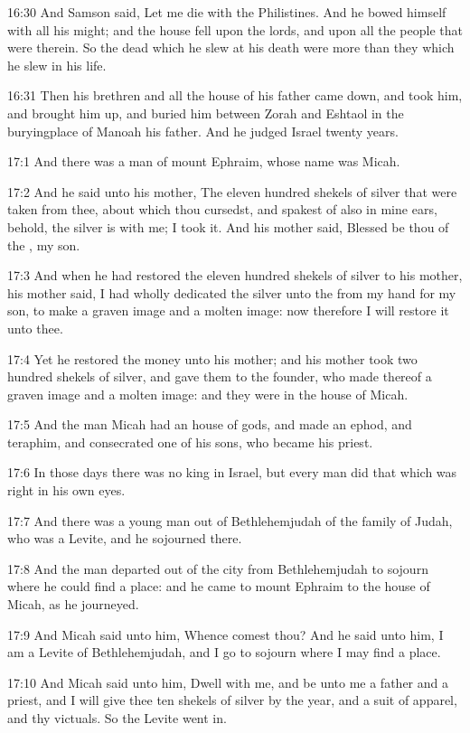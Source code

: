16:30 And Samson said, Let me die with the Philistines. And he bowed himself with all his might; and the house fell upon the lords, and upon all the people that were therein. So the dead which he slew at his death were more than they which he slew in his life.

16:31 Then his brethren and all the house of his father came down, and took him, and brought him up, and buried him between Zorah and Eshtaol in the buryingplace of Manoah his father. And he judged Israel twenty years.

17:1 And there was a man of mount Ephraim, whose name was Micah.

17:2 And he said unto his mother, The eleven hundred shekels of silver that were taken from thee, about which thou cursedst, and spakest of also in mine ears, behold, the silver is with me; I took it. And his mother said, Blessed be thou of the \LORD, my son.

17:3 And when he had restored the eleven hundred shekels of silver to his mother, his mother said, I had wholly dedicated the silver unto the \LORD from my hand for my son, to make a graven image and a molten image: now therefore I will restore it unto thee.

17:4 Yet he restored the money unto his mother; and his mother took two hundred shekels of silver, and gave them to the founder, who made thereof a graven image and a molten image: and they were in the house of Micah.

17:5 And the man Micah had an house of gods, and made an ephod, and teraphim, and consecrated one of his sons, who became his priest.

17:6 In those days there was no king in Israel, but every man did that which was right in his own eyes.

17:7 And there was a young man out of Bethlehemjudah of the family of Judah, who was a Levite, and he sojourned there.

17:8 And the man departed out of the city from Bethlehemjudah to sojourn where he could find a place: and he came to mount Ephraim to the house of Micah, as he journeyed.

17:9 And Micah said unto him, Whence comest thou? And he said unto him, I am a Levite of Bethlehemjudah, and I go to sojourn where I may find a place.

17:10 And Micah said unto him, Dwell with me, and be unto me a father and a priest, and I will give thee ten shekels of silver by the year, and a suit of apparel, and thy victuals. So the Levite went in.

